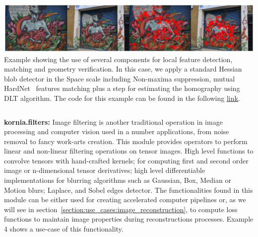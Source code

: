 \vspace{.5cm}

\begin{tcolorbox}[every float=\centering, drop shadow, title=Example 3: Feature detection and Matching]
    \label{fig:examples:feature}
    \includegraphics[width=1.\linewidth]{main/chapter03/data/examples/kornia_birdwoman.jpg}
    {Example showing the use of several components for local feature detection, matching and geometry verification. In this case, we apply a standard Hessian blob detector in the Space scale including Non-maxima suppression, mutual HardNet~\citep{mishchuk2017working} features matching plus a step for estimating the homography using DLT algorithm. The code for this example can be found in the following \underline{\color{blue}\href{https://colab.research.google.com/drive/1hl6ex1i8eNaoIZICxNqIO40PGcb8Txdo}{link}}.}
    \inputminted[python3, baselinestretch=1., style=vs, fontfamily=courier, fontsize=\footnotesize, funcnamehighlighting=true]{python}{main/chapter03/data/examples/snipet_feature.py}
\end{tcolorbox}

\newpage

\textbf{kornia.filters:} Image filtering is another traditional operation  in image processing and computer vision used in a number applications, from  noise removal to fancy work-arts creation. This module provides operators to perform linear and non-linear filtering operations on tensor images. High level functions to convolve tensors with hand-crafted kernels; for computing first and second order image or n-dimensional tensor derivatives; high level differentiable implementations for blurring algorithms such as Gaussian, Box, Median or Motion blurs; Laplace, and Sobel\citep{kanopoulos1988design} edges detector. The functionalities found in this module can be either used for creating accelerated computer pipelines or, as we will see in section~\ref{section:use_cases:image_reconstruction}, to compute loss functions to maintain image properties during reconstructions processes. Example 4 shows a use-case of this functionality.

\vspace{.5cm}

